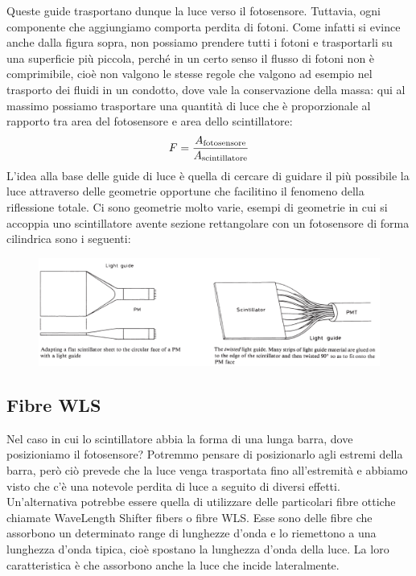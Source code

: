Queste guide trasportano dunque la luce verso il fotosensore. Tuttavia, ogni componente che aggiungiamo comporta perdita di fotoni. Come infatti si evince anche dalla figura sopra, non possiamo prendere tutti i fotoni e trasportarli su una superficie più piccola, perché in un certo senso il flusso di fotoni non è comprimibile, cioè non valgono le stesse regole che valgono ad esempio nel trasporto dei fluidi in un condotto, dove vale la conservazione della massa: qui al massimo possiamo trasportare una quantità di luce che è proporzionale al rapporto tra area del fotosensore e area dello scintillatore:
\begin{equation*}
   F=\frac{A_{\rm fotosensore}}{A_{\rm scintillatore}}
\end{equation*}
L'idea alla base delle guide di luce è quella di cercare di guidare il più possibile la luce attraverso delle geometrie opportune che facilitino il fenomeno della riflessione totale. Ci sono geometrie molto varie, esempi di geometrie in cui si accoppia uno scintillatore avente sezione rettangolare con un fotosensore di forma cilindrica sono i seguenti:
\begin{figure}[H]
   \centering
   \includegraphics[width=\textwidth]{immagini/guide_di_luce.png}
\end{figure}
\subsection{Fibre WLS}
Nel caso in cui lo scintillatore abbia la forma di una lunga barra, dove posizioniamo il fotosensore? Potremmo pensare di posizionarlo agli estremi della barra, però ciò prevede che la luce venga trasportata fino all'estremità e abbiamo visto che c'è una notevole perdita di luce a seguito di diversi effetti. Un'alternativa potrebbe essere quella di utilizzare delle particolari fibre ottiche chiamate WaveLength Shifter fibers o fibre WLS. Esse sono delle fibre che assorbono un determinato range di lunghezze d'onda e lo riemettono a una lunghezza d'onda tipica, cioè spostano la lunghezza d'onda della luce. La loro caratteristica è che assorbono anche la luce che incide lateralmente.

